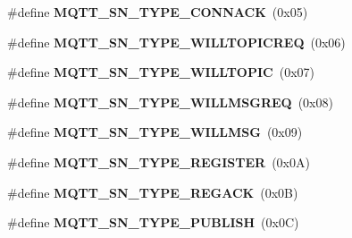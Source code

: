 \begin{DoxyCompactItemize}
\item 
\hypertarget{group__MQTT__SN__CONTROL_gac4469be7c31731176bfa8c5bd38f3a58}{\#define {\bfseries M\+Q\+T\+T\+\_\+\+S\+N\+\_\+\+T\+Y\+P\+E\+\_\+\+C\+O\+N\+N\+A\+C\+K}~(0x05)}\label{group__MQTT__SN__CONTROL_gac4469be7c31731176bfa8c5bd38f3a58}

\item 
\hypertarget{group__MQTT__SN__CONTROL_ga914fff9b2b9e7c08d6b732599f0cf348}{\#define {\bfseries M\+Q\+T\+T\+\_\+\+S\+N\+\_\+\+T\+Y\+P\+E\+\_\+\+W\+I\+L\+L\+T\+O\+P\+I\+C\+R\+E\+Q}~(0x06)}\label{group__MQTT__SN__CONTROL_ga914fff9b2b9e7c08d6b732599f0cf348}

\item 
\hypertarget{group__MQTT__SN__CONTROL_ga95c657f75f0f02a093b8623a50dc0af8}{\#define {\bfseries M\+Q\+T\+T\+\_\+\+S\+N\+\_\+\+T\+Y\+P\+E\+\_\+\+W\+I\+L\+L\+T\+O\+P\+I\+C}~(0x07)}\label{group__MQTT__SN__CONTROL_ga95c657f75f0f02a093b8623a50dc0af8}

\item 
\hypertarget{group__MQTT__SN__CONTROL_gaefa36203de4d9ff51372abd51fa6521a}{\#define {\bfseries M\+Q\+T\+T\+\_\+\+S\+N\+\_\+\+T\+Y\+P\+E\+\_\+\+W\+I\+L\+L\+M\+S\+G\+R\+E\+Q}~(0x08)}\label{group__MQTT__SN__CONTROL_gaefa36203de4d9ff51372abd51fa6521a}

\item 
\hypertarget{group__MQTT__SN__CONTROL_ga0ab12c9559a2419e1c88080fa3c594c0}{\#define {\bfseries M\+Q\+T\+T\+\_\+\+S\+N\+\_\+\+T\+Y\+P\+E\+\_\+\+W\+I\+L\+L\+M\+S\+G}~(0x09)}\label{group__MQTT__SN__CONTROL_ga0ab12c9559a2419e1c88080fa3c594c0}

\item 
\hypertarget{group__MQTT__SN__CONTROL_ga742472508835bbeab8a22d6294f34e8f}{\#define {\bfseries M\+Q\+T\+T\+\_\+\+S\+N\+\_\+\+T\+Y\+P\+E\+\_\+\+R\+E\+G\+I\+S\+T\+E\+R}~(0x0\+A)}\label{group__MQTT__SN__CONTROL_ga742472508835bbeab8a22d6294f34e8f}

\item 
\hypertarget{group__MQTT__SN__CONTROL_gab600be8ae75c06a49cc89d0f7255ac12}{\#define {\bfseries M\+Q\+T\+T\+\_\+\+S\+N\+\_\+\+T\+Y\+P\+E\+\_\+\+R\+E\+G\+A\+C\+K}~(0x0\+B)}\label{group__MQTT__SN__CONTROL_gab600be8ae75c06a49cc89d0f7255ac12}

\item 
\hypertarget{group__MQTT__SN__CONTROL_ga1c34c285be401165ca3b9ef1c9180354}{\#define {\bfseries M\+Q\+T\+T\+\_\+\+S\+N\+\_\+\+T\+Y\+P\+E\+\_\+\+P\+U\+B\+L\+I\+S\+H}~(0x0\+C)}\label{group__MQTT__SN__CONTROL_ga1c34c285be401165ca3b9ef1c9180354}


\end{DoxyCompactItemize}
